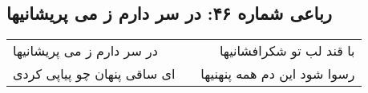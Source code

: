 \begin{center}
\section*{رباعی شماره ۴۶: در سر دارم ز می پریشانیها}
\label{sec:0046}
\begin{longtable}{l p{0.5cm} r}
در سر دارم ز می پریشانیها
&&
با قند لب تو شکرافشانیها
\\
ای ساقی پنهان چو پیاپی کردی
&&
رسوا شود این دم همه پنهنیها
\\
\end{longtable}
\end{center}
